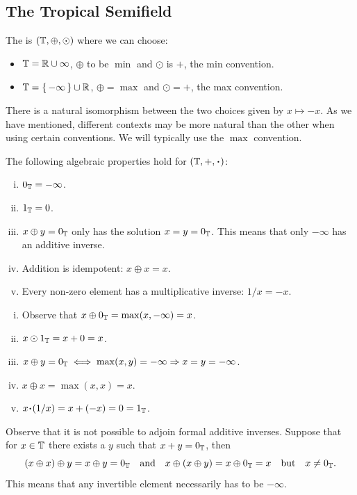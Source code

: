 \documentclass[12pt]{memoir}
\begin{document}
\subsection{The Tropical Semifield}

\begin{Def}
    The  is $(\mathbb{T},\oplus,\odot)$ where we can choose:
    \begin{itemize}
        \item $\mathbb{T}=\mathbb{R}\cup\infty$, $\oplus$ to be $\min$ and $\odot$ is $+$, the min convention.
        \item $\mathbb{T}=\{\,-\infty\,\}\cup\mathbb{R}$, $\oplus=\max$ and $\odot=+$, the max convention.
    \end{itemize}
\end{Def}

There is a natural isomorphism between the two choices given by $x\mapsto -x$. As we have mentioned, different contexts may be more natural than the other when using certain conventions. We will typically use the $\max$ convention. 

\begin{Prop}
The following algebraic properties hold for $(\bT,+,\.)$:
\begin{enumerate}[i)]
    \itemsep=-0.4em
    \item $0_{\mathbb{T}}=-\infty$.
    \item $1_{\mathbb{T}}=0$.
    \item $x\oplus y=0_{\mathbb{T}}$ only has the solution $x=y=0_{\mathbb{T}}$. This means that only $-\infty$ has an additive inverse.
    \item Addition is idempotent: $x\oplus x=x$.
    \item Every non-zero element has a multiplicative inverse: $1/x=-x$.
\end{enumerate}
\end{Prop}

\begin{ptcbp}
    \begin{enumerate}[i)]
        \itemsep=-0.4em
    \item Observe that $x\oplus0_{\mathbb{T}}=\max(x,-\infty)=x$.
    \item $x\odot 1_{\mathbb{T}}=x+0=x$.
    \item $x\oplus y=0_{\mathbb{T}}\iff \max(x,y)=-\infty\Rightarrow x=y=-\infty$.
    \item $x\oplus x=\max(x,x)=x$.
    \item $x\.(1/x)=x+(-x)=0=1_\bT$.
\end{enumerate}
\end{ptcbp}
Observe that it is not possible to adjoin formal additive inverses. Suppose that for $x\in\mathbb{T}$ there exists a $y$ such that $x+y=0_{\mathbb{T}}$, then 
$$(x\oplus x)\oplus y=x\oplus y=0_{\mathbb{T}}\quad\text{and}\quad x\oplus (x\oplus y)=x\oplus 0_{\mathbb{T}}=x\quad\text{but}\quad x\neq 0_{\mathbb{T}}.$$
This means that any invertible element necessarily has to be $-\infty$.
\end{document}
